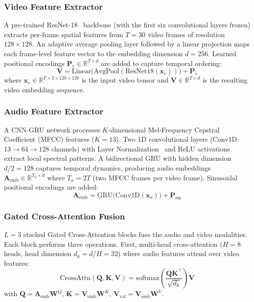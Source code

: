 \documentclass[lettersize,journal]{IEEEtran}
\begin{document}
\subsubsection{Video Feature Extractor}
A pre-trained ResNet-18~\cite{he2016resnet} backbone (with the first six convolutional layers frozen) extracts per-frame spatial features from $T = 30$ video frames of resolution $128 \times 128$. An adaptive average pooling layer followed by a linear projection maps each frame-level feature vector to the embedding dimension $d = 256$. Learned positional encodings $\mathbf{P}_v \in \mathbb{R}^{T \times d}$ are added to capture temporal ordering:
\begin{equation}
    \mathbf{V} = \text{Linear}\bigl(\text{AvgPool}(\text{ResNet18}(\mathbf{x}_v))\bigr) + \mathbf{P}_v
\end{equation}
where $\mathbf{x}_v \in \mathbb{R}^{T \times 3 \times 128 \times 128}$ is the input video tensor and $\mathbf{V} \in \mathbb{R}^{T \times d}$ is the resulting video embedding sequence.

\subsubsection{Audio Feature Extractor}
A CNN-GRU network processes $K$-dimensional Mel-Frequency Cepstral Coefficient (MFCC) features ($K = 13$). Two 1D convolutional layers (Conv1D: $13 \rightarrow 64 \rightarrow 128$ channels) with Layer Normalization~\cite{ba2016layernorm} and ReLU activations extract local spectral patterns. A bidirectional GRU with hidden dimension $d/2 = 128$ captures temporal dynamics, producing audio embeddings $\mathbf{A}_{\text{emb}} \in \mathbb{R}^{T_a \times d}$ where $T_a = 2T$ (two MFCC frames per video frame). Sinusoidal positional encodings are added:
\begin{equation}
    \mathbf{A}_{\text{emb}} = \text{GRU}\bigl(\text{Conv1D}(\mathbf{x}_a)\bigr) + \mathbf{P}_{\text{sin}}
\end{equation}

\subsubsection{Gated Cross-Attention Fusion}
$L = 3$ stacked Gated Cross-Attention blocks fuse the audio and video modalities. Each block performs three operations. First, multi-head cross-attention ($H = 8$ heads, head dimension $d_k = d/H = 32$) where audio features attend over video features:
\begin{equation}
\label{eq:cross_attn}
    \text{CrossAttn}(\mathbf{Q}, \mathbf{K}, \mathbf{V}) = \text{softmax}\!\left(\frac{\mathbf{Q}\mathbf{K}^\top}{\sqrt{d_k}}\right)\mathbf{V}
\end{equation}
with $\mathbf{Q} = \mathbf{A}_{\text{emb}}\mathbf{W}^Q$, $\mathbf{K} = \mathbf{V}_{\text{emb}}\mathbf{W}^K$, $\mathbf{V}_{\text{val}} = \mathbf{V}_{\text{emb}}\mathbf{W}^V$.
\end{document}
